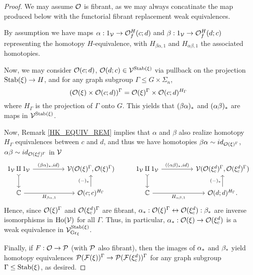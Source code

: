 \documentclass[a4paper,10pt
,draft
]{article}%
\renewcommand{\F}{\mathcal F}
\renewcommand{\1}{\ensuremath{\mathbb{id}}}
\begin{document}
\begin{proof}
      We may assume $\O$ is fibrant, as we may always concatinate the map produced below with the functorial fibrant replacement weak equivalences.
      
      By assumption we have maps
      $\alpha: 1_\V \to \O^H_f(c;d)$ and $\beta: 1_\V \to \O^H_f(d;c)$
      representing the homotopy $H$-equivalence,
      with $H_{\beta\alpha,1}$ and $H_{\alpha\beta,1}$ the associated homotopies. 

      Now, we may consider $\O(c;d)$, $\O(d;c) \in \V^{\Stab(\ksi)}$ via pullback on the projection $\Stab(\ksi) \to H$,
      and for any graph subgroup $\Gamma \leq G \times \Sigma_n$,
      \begin{equation}
            (\O(\ksi) \times \O(c;d))^\Gamma = \O(\ksi)^\Gamma \times \O(c;d)^{H_\Gamma}
      \end{equation}
      where $H_\Gamma$ is the projection of $\Gamma$ onto $G$.
      This yields that $(\beta\alpha)_{\**}$ and $(\alpha\beta)_{\**}$ are maps in $\V^{\Stab(\ksi)}$.
      
      Now, Remark \ref{HK_EQUIV_REM} implies that $\alpha$ and $\beta$ also realize homotopy $H_\Gamma$ equivalences between $c$ and $d$,
      and thus we have homotopies $\beta\alpha \sim id_{\O(\ksi)^{\Gamma}}$, $\alpha\beta \sim id_{\O(\ksi_c^d)^\Gamma}$ in $\V$
      \begin{equation}
            \begin{tikzcd}
                  1_\V \amalg 1_\V \arrow[d, tail] \arrow[rr, "{(\beta\alpha)_{\**}, id)}"]
                  &&
                  \V(\O(\ksi)^\Gamma, \O(\ksi)^\Gamma)
                  &
                  1_\V \amalg 1_\V \arrow[d, tail] \arrow[rr, "{((\alpha\beta)_{\**}, id)}"]
                  &&
                  \V(\O(\ksi_c^d)^\Gamma, \O(\ksi_c^d)^\Gamma)
                  \\
                  \mathbb C \arrow[rr, "H_{\beta\alpha,1}"']
                  &&
                  \O(c;c)^{H_\Gamma} \arrow[u, "{(-)_{\**}}"]
                  &
                  \mathbb C \arrow[rr, "H_{\alpha\beta,1}"']
                  &&
                  \O(d;d)^{H_\Gamma} \arrow[u, "{(-)_{\**}}"].
            \end{tikzcd}
      \end{equation}
      Hence, since $\O(\ksi)^\Gamma$ and $\O(\ksi_c^d)^\Gamma$ are fibrant,
      $\alpha_{\**}: \O(\ksi)^\Gamma \leftrightarrow \O(\ksi_c^d) : \beta_{\**}$ are inverse isomorphisms in $\Ho(\V)$ for all $\Gamma$.
      Thus, in particular, $\alpha_{\**}: \O(\ksi) \to \O(\ksi_c^d)$ is a weak equivalence in $\V^{\Stab(\ksi)}_{\mathrm{Gr}_\ksi}$.

      Finally, if $F: \O \to \P$ (with $\P$ also fibrant),
      then the images of $\alpha_{\**}$ and $\beta_{\**}$ yield
      homotopy equivalences $\P(\F(\ksi))^\Gamma \to \P(\F(\ksi_c^d))^\Gamma$ for any graph subgroup $\Gamma \leq \Stab(\ksi)$,
      as desired.
\end{proof}
\end{document}
